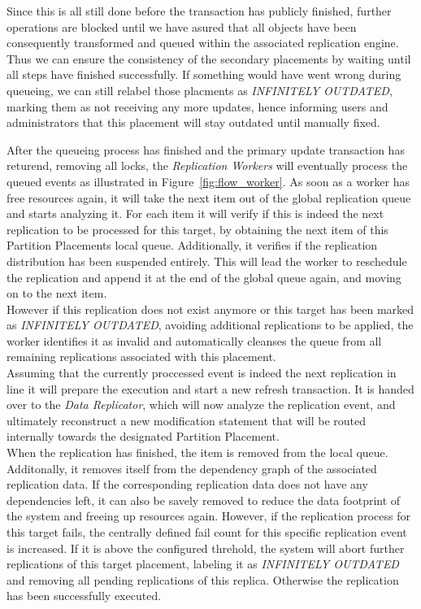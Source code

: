Since this is all still done before the transaction has publicly finished, further operations are blocked until we have asured that all objects have been consequently 
transformed and queued within the associated replication engine. Thus we can ensure the consistency of the secondary placements by waiting until all steps have finished 
successfully. If something would have went wrong during queueing, we can still relabel those placments as \emph{INFINITELY OUTDATED}, marking them as not receiving any more updates, 
hence informing users and administrators that this placement will stay outdated until manually fixed.

After the queueing process has finished and the primary update transaction has returend, removing all locks, the \emph{Replication Workers} will eventually process the queued events as illustrated in Figure~\ref{fig:flow_worker}.
As soon as a worker has free resources again, it will take the next item out of the global replication queue and starts analyzing it.
For each item it will verify if this is indeed the next replication to be processed for this target, by obtaining the next item of this Partition Placements local queue.
Additionally, it verifies if the replication distribution has been suspended entirely. This will lead the worker to reschedule the replication
and append it at the end of the global queue again, and moving on to the next item.\\
However if this replication does not exist anymore or this target has been marked as \emph{INFINITELY OUTDATED}, avoiding additional replications to be applied,
the worker identifies it as invalid and automatically cleanses the queue from all remaining replications associated with this placement.\\
Assuming that the currently proccessed event is indeed the next replication in line it will prepare the execution and start a new refresh transaction. 
It is handed over to the \emph{Data Replicator}, which will now analyze the replication event, and ultimately reconstruct a new modification statement that will be routed internally towards 
the designated Partition Placement.\\
When the replication has finished, the item is removed from the local queue. Additonally, it removes itself from the dependency graph of the associated replication data.
If the corresponding replication data does not have any dependencies left, it can also be savely removed to reduce the data footprint of the system and freeing up resources again.
However, if the replication process for this target fails, the centrally defined fail count for this specific replication event is increased. 
If it is above the configured threhold, the system will abort further replications of this target placement, labeling it as \emph{INFINITELY OUTDATED} and removing all pending
replications of this replica. Otherwise the replication has been successfully executed.

